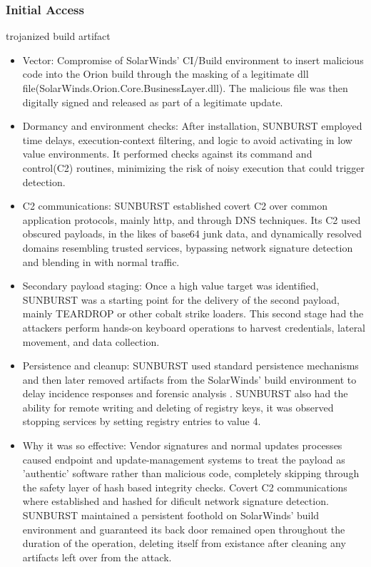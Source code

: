\documentclass[conference]{IEEEtran}
\begin{document}
\subsubsection{Initial Access}
trojanized build artifact
\begin{itemize}
    \item Vector: Compromise of SolarWinds' CI/Build environment to insert malicious code into the Orion build through the masking of a legitimate dll file(SolarWinds.Orion.Core.BusinessLayer.dll).
    The malicious file was then digitally signed and released as part of a legitimate update.\cite{MicrosoftDeepDiveSOLORIGATE}
    \item Dormancy and environment checks: After installation, SUNBURST employed time delays, execution-context filtering, and logic to avoid activating in low value environments.
    It performed checks against its command and control(C2) routines, minimizing the risk of noisy execution that could trigger detection.\cite{MicrosoftDeepDiveSOLORIGATE}
    \item C2 communications: SUNBURST established covert C2 over common application protocols, mainly http, and through DNS techniques. Its C2 used obscured payloads, in the likes
    of base64 junk data, and dynamically resolved domains resembling trusted services, bypassing network signature detection and blending in with normal traffic.\cite{MicrosoftDeepDiveSOLORIGATE}
    \item Secondary payload staging: Once a high value target was identified, SUNBURST was a starting point for the delivery of the second payload, mainly TEARDROP or other cobalt strike loaders.
    This second stage had the attackers perform hands-on keyboard operations to harvest credentials, lateral movement, and data collection.\cite{MicrosoftDeepDiveSOLORIGATE}
    \item Persistence and cleanup: SUNBURST used standard persistence mechanisms and then later removed artifacts from the SolarWinds' build environment to delay incidence responses
    and forensic analysis \cite{MicrosoftDeepDiveSOLORIGATE}. SUNBURST also had the ability for remote writing and deleting of registry keys, it was observed stopping services by setting
     registry entries to value 4\cite{MITRE2025SunburstS0559}. 
    \item Why it was so effective: Vendor signatures and normal updates processes caused endpoint and update-management systems to treat the payload as 'authentic' software
    rather than malicious code, completely skipping through the safety layer of hash based integrity checks. Covert C2 communications where established and hashed for dificult network signature detection\cite{MITRE2025SunburstS0559}.
    SUNBURST maintained a persistent foothold on SolarWinds' build environment and guaranteed its back door remained open throughout the duration of the operation, deleting itself from existance after cleaning 
    any artifacts left over from the attack.
\end{itemize}
\end{document}

